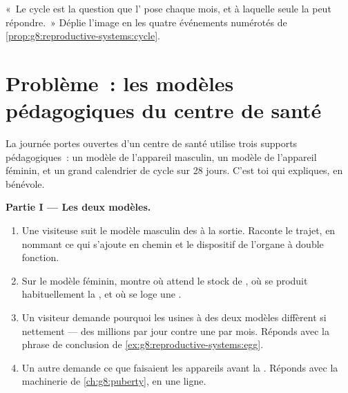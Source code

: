 \begin{exercise}[$\star\star\star$]\label{exo:g8:reproductive-systems:12}
«~Le cycle est la question que l' pose chaque mois, et à
laquelle seule la  peut répondre.~» Déplie l'image en les
quatre événements numérotés de
\cref{prop:g8:reproductive-systems:cycle}.
\end{exercise}

\section{Problème~: les modèles pédagogiques du centre de santé}

\begin{problem}\label{pb:g8:reproductive-systems:1}
La journée portes ouvertes d'un centre de santé utilise trois
supports pédagogiques~: un modèle de l'appareil masculin, un modèle
de l'appareil féminin, et un grand calendrier de cycle sur 28 jours.
C'est toi qui expliques, en bénévole.

\medskip\noindent\textbf{Partie I --- Les deux modèles.}
\begin{enumerate}
  \item Une visiteuse suit le modèle masculin des  à la
        sortie. Raconte le trajet, en nommant ce qui s'ajoute en
        chemin et le dispositif de l'organe à double fonction.
  \item Sur le modèle féminin, montre où attend le stock de
        , où se produit habituellement la , et où
        se loge une .
  \item Un visiteur demande pourquoi les usines à  des deux
        modèles diffèrent si nettement --- des millions par jour
        contre une par mois. Réponds avec la phrase de conclusion de
        \cref{ex:g8:reproductive-systems:egg}.
  \item Un autre demande ce que faisaient les appareils avant la
        . Réponds avec la machinerie de
        \cref{ch:g8:puberty}, en une ligne.
\end{enumerate}


\end{problem}
